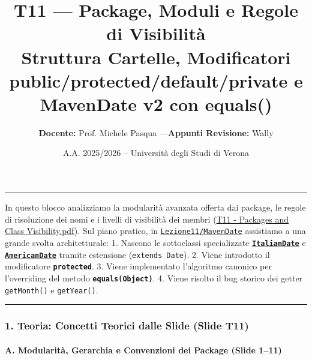\documentclass[11pt,a4paper]{article}
\title{\Huge\bfseries\sffamily\color{brandblue} T11 --- Package, Moduli e Regole di Visibilità \\[0.3em] \large\sffamily Struttura Cartelle, Modificatori public/protected/default/private e MavenDate v2 con equals()}
\author{\textbf{Docente:} Prof. Michele Pasqua \quad---\quad \textbf{Appunti Revisione:} Wally}
\date{A.A. 2025/2026 -- Universit\`a degli Studi di Verona}
\newcommand{\passthrough}[1]{#1}
\begin{document}
\maketitle
\thispagestyle{fancy}
\vspace{-1.2em}
\noindent\textcolor{brandblue}{\rule{\textwidth}{0.8pt}}
\vspace{1.2em}

In questo blocco analizziamo la modularità avanzata offerta dai package,
le regole di risoluzione dei nomi e i livelli di visibilità dei membri
(\href{file:///home/wally/Documenti/GitHub/Programmazione-II/25-26/Teoria-e-Esercitazioni/Slides-20260902/T11\%20-\%20Packages\%20and\%20Class\%20Visibility.pdf}{T11
- Packages and Class Visibility.pdf}). Sul piano pratico, in
\href{file:///home/wally/Documenti/GitHub/Programmazione-II/25-26/Teoria-e-Esercitazioni/Codice-20260902/Lezione11/MavenDate}{\passthrough{\lstinline!Lezione11/MavenDate!}}
assistiamo a una grande svolta architetturale: 1. Nascono le sottoclassi
specializzate
\textbf{\href{file:///home/wally/Documenti/GitHub/Programmazione-II/25-26/Teoria-e-Esercitazioni/Codice-20260902/Lezione11/MavenDate/src/main/java/it/oop/core/ItalianDate.java}{\passthrough{\lstinline!ItalianDate!}}}
e
\textbf{\href{file:///home/wally/Documenti/GitHub/Programmazione-II/25-26/Teoria-e-Esercitazioni/Codice-20260902/Lezione11/MavenDate/src/main/java/it/oop/core/AmericanDate.java}{\passthrough{\lstinline!AmericanDate!}}}
tramite estensione (\passthrough{\lstinline!extends Date!}). 2. Viene
introdotto il modificatore \textbf{\passthrough{\lstinline!protected!}}.
3. Viene implementato l'algoritmo canonico per l'overriding del metodo
\textbf{\passthrough{\lstinline!equals(Object)!}}. 4. Viene risolto il
bug storico dei getter \passthrough{\lstinline!getMonth()!} e
\passthrough{\lstinline!getYear()!}.

\begin{center}\rule{0.5\linewidth}{0.5pt}\end{center}

\subsubsection{1. Teoria: Concetti Teorici dalle Slide (Slide
T11)}\label{teoria-concetti-teorici-dalle-slide-slide-t11}

\paragraph{A. Modularità, Gerarchia e Convenzioni dei Package (Slide
1--11)}\label{a.-modularituxe0-gerarchia-e-convenzioni-dei-package-slide-111}
\end{document}
